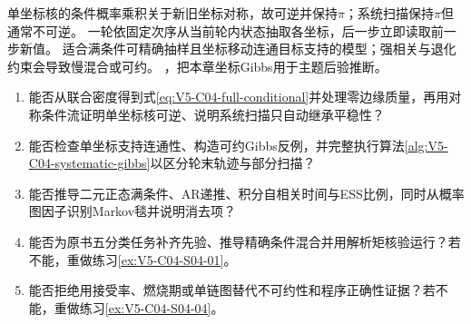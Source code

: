 \begin{SLCompactClosure}
\label{struct:V5-C04-CH36}
{单坐标核的条件概率乘积关于新旧坐标对称，故可逆并保持$\pi$；系统扫描保持$\pi$但通常不可逆。}
{一轮依固定次序从当前轮内状态抽取各坐标，后一步立即读取前一步新值。}
{适合满条件可精确抽样且坐标移动连通目标支持的模型；强相关与退化约束会导致慢混合或可约。}
{，把本章坐标Gibbs用于主题后验推断。}

\label{struct:V5-C04-CH37}
\begin{selfcheckbox}
\small
\begin{enumerate}[leftmargin=2.2em,itemsep=0.15em,topsep=0.25em,parsep=0pt]
  \item 能否从联合密度得到式\eqref{eq:V5-C04-full-conditional}并处理零边缘质量，再用对称条件流证明单坐标核可逆、说明系统扫描只自动继承平稳性？
  \item 能否检查单坐标支持连通性、构造可约Gibbs反例，并完整执行算法\ref{alg:V5-C04-systematic-gibbs}以区分轮末轨迹与部分扫描？
  \item 能否推导二元正态满条件、AR递推、积分自相关时间与ESS比例，同时从概率图因子识别Markov毯并说明消去项？
  \item 能否为原书五分类任务补齐先验、推导精确条件混合并用解析矩核验运行？若不能，重做练习\ref{ex:V5-C04-S04-01}。
  \item 能否拒绝用接受率、燃烧期或单链图替代不可约性和程序正确性证据？若不能，重做练习\ref{ex:V5-C04-S04-04}。
\end{enumerate}
\end{selfcheckbox}
\end{SLCompactClosure}
